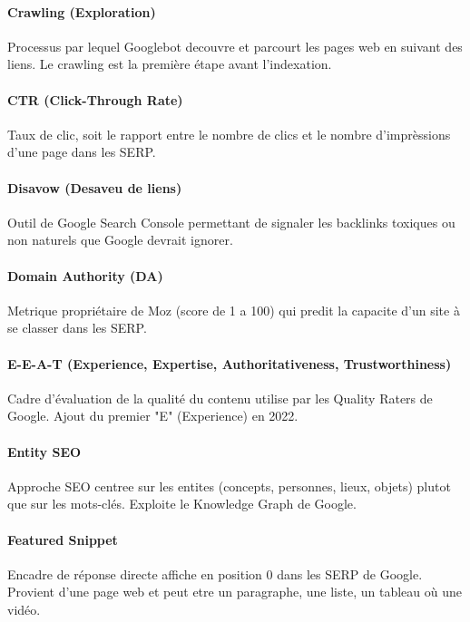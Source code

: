 \documentclass[12pt,a4paper,twoside]{report}
\begin{document}
\paragraph*{Crawling (Exploration)}
Processus par lequel Googlebot decouvre et parcourt les pages web en suivant des liens. Le crawling est la première étape avant l'indexation.

\paragraph*{CTR (Click-Through Rate)}
Taux de clic, soit le rapport entre le nombre de clics et le nombre d'imprèssions d'une page dans les SERP.

\paragraph*{Disavow (Desaveu de liens)}
Outil de Google Search Console permettant de signaler les backlinks toxiques ou non naturels que Google devrait ignorer.

\paragraph*{Domain Authority (DA)}
Metrique propriétaire de Moz (score de 1 a 100) qui predit la capacite d'un site à se classer dans les SERP.

\paragraph*{E-E-A-T (Experience, Expertise, Authoritativeness, Trustworthiness)}
Cadre d'évaluation de la qualité du contenu utilise par les Quality Raters de Google. Ajout du premier "E" (Experience) en 2022.

\paragraph*{Entity SEO}
Approche SEO centree sur les entites (concepts, personnes, lieux, objets) plutot que sur les mots-clés. Exploite le Knowledge Graph de Google.

\paragraph*{Featured Snippet}
Encadre de réponse directe affiche en position 0 dans les SERP de Google. Provient d'une page web et peut etre un paragraphe, une liste, un tableau où une vidéo.
\end{document}
